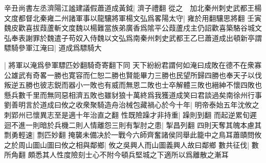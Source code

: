 辛丑尚書左丞濟陽江謐建議假蕭道成黃鉞|{
	濟子禮翻}
從之　加北秦州刺史武都王楊文度都督北秦雍二州諸軍事以龍驤將軍楊文弘爲畧陽太守|{
	雍於用翻驤思將翻}
壬寅魏皮歡喜拔葭蘆斬文度魏以楊難當族弟廣香爲隂平公葭蘆戍主仍詔歡喜築駱谷城文弘奉表謝罪於魏遣子苟奴入侍魏以文弘爲南秦州刺史武都王乙巳蕭道成出頓新亭謂驃騎參軍江淹曰|{
	道成爲驃騎大}


|{
	將軍以淹爲參軍驃匹妙翻騎奇寄翻下同}
天下紛紛君謂何如淹曰成敗在德不在衆寡公雄武有奇畧一勝也寛容而仁恕二勝也賢能畢力三勝也民望所歸四勝也奉天子以伐叛逆五勝也彼志鋭而器小一敗也有威而無恩二敗也士卒解體三敗也縉紳不懷四敗也懸兵數千里而無同惡相濟五敗也雖豺狼十萬終爲我獲道成笑曰君談過矣南徐州行事劉善明言於道成曰攸之收衆聚騎造舟治械包藏禍心於今十年|{
	明帝泰始五年沈攸之刺郢州已懷異志至是適十年治直之翻}
性既險躁才非持重|{
	躁則到翻}
而起逆累旬遲迴不進一則暗於兵機二則人情離怨三則有掣肘之患|{
	掣昌列翻}
四則天奪其魄本慮其剽勇輕速|{
	剽匹妙翻}
掩襲未備决於一戰今六師齊奮諸侯同舉此籠中之鳥耳蕭賾問攸之於周山圖山圖曰攸之相與鄰鄉|{
	攸之吳興人而山圖義興人故曰鄰鄉}
數共征伐|{
	數所角翻}
頗悉其人性度險刻士心不附今頓兵堅城之下適所以爲離散之漸耳

